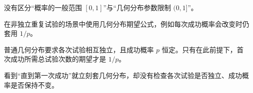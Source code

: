 \begin{trapbox}
\begin{description}[style=nextline, leftmargin=2.8em, labelsep=0.5em, itemsep=0.35em]
		\item[\textbf{\textcolor{CTrap}{错因分析（定义域模糊）：}}]
		      没有区分“概率的一般范围 $[0,1]$”与“几何分布参数限制 $(0,1]$”。
	\end{description}

	\medskip

	\begin{description}[style=nextline, leftmargin=2.8em, labelsep=0.5em, itemsep=0.35em]
		\item[\textbf{\textcolor{CTrap}{易错点四（条件遗漏）：}}]
		      在非独立重复试验的场景中使用几何分布期望公式，例如每次成功概率会改变时仍套用 $1/p$。

		\item[\textbf{\textcolor{CTrap}{正确理解（独立同概率前提）：}}]
		      普通几何分布要求各次试验相互独立，且成功概率 $p$ 恒定。只有在此前提下，首次成功所需总试验次数的期望才是 $1/p$。

		\item[\textbf{\textcolor{CTrap}{错因分析（模型误判）：}}]
		      看到“直到第一次成功”就立刻套几何分布，却没有检查各次试验是否独立、成功概率是否保持不变。
	\end{description}
\end{trapbox}
